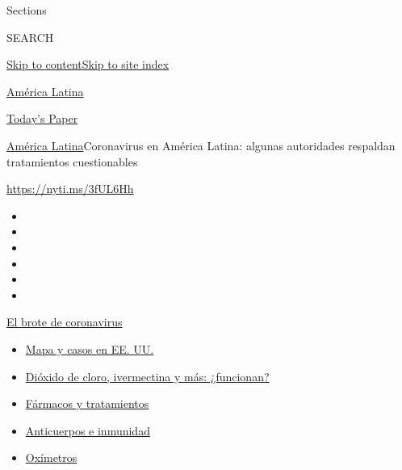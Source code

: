 Sections

SEARCH

\protect\hyperlink{site-content}{Skip to
content}\protect\hyperlink{site-index}{Skip to site index}

\href{https://www.nytimes.com/es/section/america-latina}{América Latina}

\href{https://myaccount.nytimes.com/auth/login?response_type=cookie\&client_id=vi}{}

\href{https://www.nytimes.com/section/todayspaper}{Today's Paper}

\href{/es/section/america-latina}{América Latina}\textbar{}Coronavirus
en América Latina: algunas autoridades respaldan tratamientos
cuestionables

\url{https://nyti.ms/3fUL6Hh}

\begin{itemize}
\item
\item
\item
\item
\item
\item
\end{itemize}

\href{https://www.nytimes.com/es/spotlight/coronavirus?action=click\&pgtype=Article\&state=default\&region=TOP_BANNER\&context=storylines_menu}{El
brote de coronavirus}

\begin{itemize}
\tightlist
\item
  \href{https://www.nytimes.com/es/interactive/2020/espanol/mundo/coronavirus-en-estados-unidos.html?action=click\&pgtype=Article\&state=default\&region=TOP_BANNER\&context=storylines_menu}{Mapa
  y casos en EE. UU.}
\item
  \href{https://www.nytimes.com/es/2020/07/23/espanol/america-latina/bolivia-cloro-coronavirus-ivermectina.html?action=click\&pgtype=Article\&state=default\&region=TOP_BANNER\&context=storylines_menu}{Dióxido
  de cloro, ivermectina y más: ¿funcionan?}
\item
  \href{https://www.nytimes.com/es/interactive/2020/science/coronavirus-tratamientos-curas.html?action=click\&pgtype=Article\&state=default\&region=TOP_BANNER\&context=storylines_menu}{Fármacos
  y tratamientos}
\item
  \href{https://www.nytimes.com/es/2020/07/28/espanol/ciencia-y-tecnologia/anticuerpos-coronavirus-inmunidad.html?action=click\&pgtype=Article\&state=default\&region=TOP_BANNER\&context=storylines_menu}{Anticuerpos
  e inmunidad}
\item
  \href{https://www.nytimes.com/es/2020/04/29/espanol/estilos-de-vida/oximetro-para-que-sirve.html?action=click\&pgtype=Article\&state=default\&region=TOP_BANNER\&context=storylines_menu}{Oxímetros}
\end{itemize}

